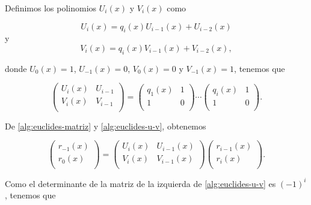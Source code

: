 Definimos los polinomios $U_i(x)$ y $V_i(x)$ como

\begin{equation}
    \label{alg:euclides-u}
    U_i(x) = q_i(x)U_{i-1}(x) + U_{i-2}(x)
\end{equation}
y
$$V_i(x) = q_i(x)V_{i-1}(x) + V_{i-2}(x),$$

donde $U_0(x) = 1$, $U_{-1}(x) = 0$, $V_0(x) = 0$ y $V_{-1}(x) = 1$, tenemos que

\begin{equation}
    \label{alg:euclides-u-v}
    \left( 
        \begin{array}{cc}  
            U_i(x) & U_{i-1} \\
            V_i(x) & V_{i-1} \\
        \end{array} 
    \right)
    = 
    \left( 
        \begin{array}{cc}  
            q_{1}(x) & 1 \\
            1 & 0 \\
        \end{array} 
    \right)
    \cdots
    \left( 
        \begin{array}{cc}  
            q_{i}(x) & 1 \\
            1 & 0 \\
        \end{array} 
    \right).
\end{equation}

De \eqref{alg:euclides-matriz} y \eqref{alg:euclides-u-v}, obtenemos

\[
    \left( 
        \begin{array}{c}  
            r_{-1}(x) \\
            r_{0}(x) \\
        \end{array} 
    \right)
    = 
    \left( 
        \begin{array}{cc}  
            U_i(x) & U_{i-1}(x) \\
            V_i(x) & V_{i-1}(x) \\
        \end{array} 
    \right)
    \left( 
        \begin{array}{c}  
            r_{i-1}(x) \\
            r_{i}(x) \\
        \end{array} 
    \right).
\]

Como el determinante de la matriz de la izquierda de \ref{alg:euclides-u-v} es $(-1)^i$, tenemos que


